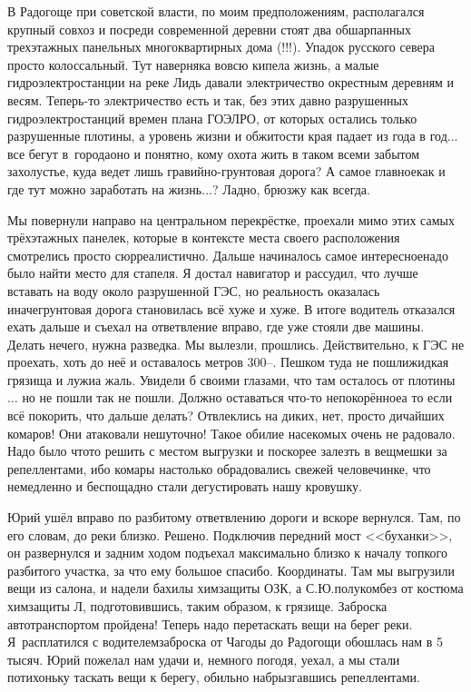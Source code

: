 В Радогоще при советской власти, по моим предположениям, располагался крупный совхоз и посреди современной деревни стоят два обшарпанных трехэтажных панельных многоквартирных дома (!!!). Упадок русского севера просто колоссальный. Тут наверняка вовсю кипела жизнь, а малые гидроэлектростанции на реке Лидь давали электричество окрестным деревням и весям. Теперь-то электричество есть и так, без этих давно разрушенных гидроэлектростанций времен плана ГОЭЛРО, от которых остались только разрушенные плотины, а уровень жизни и обжитости края падает из года в год$\ldots$ все бегут в~города\mdash оно и понятно, кому охота жить в таком всеми забытом захолустье, куда ведет лишь гравийно-грунтовая дорога? А самое главное\mdash как и где тут можно заработать на жизнь$\ldots$? Ладно, брюзжу как всегда. 

Мы повернули направо на центральном перекрёстке, проехали мимо этих самых трёхэтажных панелек, которые в контексте места своего расположения смотрелись просто сюрреалистично. Дальше начиналось самое интересное\mdash надо было найти место для стапеля. Я достал навигатор и рассудил, что лучше вставать на воду около разрушенной ГЭС, но реальность оказалась иначе\mdash грунтовая дорога становилась всё хуже и хуже. В итоге водитель отказался ехать дальше и съехал на ответвление вправо, где уже стояли две машины. Делать нечего, нужна разведка. Мы вылезли, прошлись. Действительно, к ГЭС не проехать, хоть до неё и оставалось метров 300\thinspace\nobreakdash--. Пешком туда не пошли\mdash жидкая грязища и лужи\mdash а жаль. Увидели б своими глазами, что там осталось от плотины$\ldots$ но не пошли так не пошли. Должно оставаться что-то непокорённое\mdash а то если всё покорить, что дальше делать? Отвлеклись на диких, нет, просто дичайших комаров! Они атаковали нешуточно! Такое обилие насекомых очень не радовало. Надо было что\sdash то решить с местом выгрузки и поскорее залезть в вещмешки за репеллентами, ибо комары настолько обрадовались свежей человечинке, что немедленно и беспощадно стали дегустировать нашу кровушку.

Юрий ушёл вправо по разбитому ответвлению дороги и вскоре вернулся. Там, по его словам, до реки близко. Решено. Подключив передний мост <<буханки>>, он развернулся и задним ходом подъехал максимально близко к началу топкого разбитого участка, за что ему большое спасибо. Координаты\mdash \CoordsLidSeventeenStapel. Там мы выгрузили вещи из салона, и надели бахилы химзащиты ОЗК, а С.Ю.\mdash полукомбез от костюма химзащиты Л, подготовившись, таким образом, к грязище. Заброска автотранспортом пройдена! Теперь надо перетаскать вещи на берег реки. Я~расплатился с водителем\mdash заброска от Чагоды до Радогощи обошлась нам в 5 тысяч. Юрий пожелал нам удачи и, немного погодя, уехал, а мы стали потихоньку таскать вещи к берегу, обильно набрызгавшись репеллентами.

